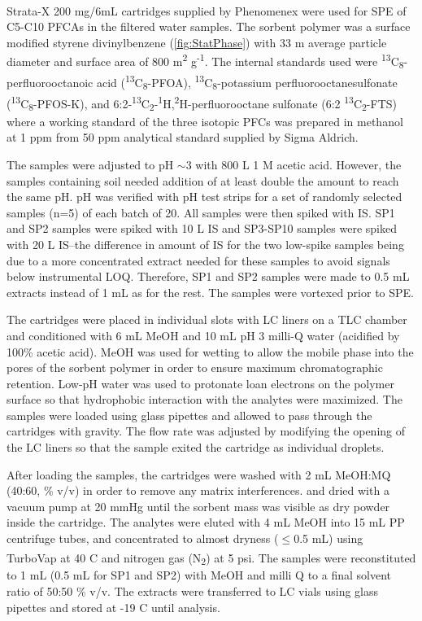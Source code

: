 Strata-X\textsuperscript{\textregistered} 200 mg/6mL cartridges supplied by Phenomenex were used for SPE of C5-C10 PFCAs in the filtered water samples. The sorbent polymer was a surface modified styrene divinylbenzene (\cref{fig:StatPhase}) with 33 \textmu m average particle diameter and surface area of 800 m\textsuperscript{2} g\textsuperscript{-1}. The internal standards used were \textsuperscript{13}C\textsubscript{8}-perfluorooctanoic acid  (\textsuperscript{13}C\textsubscript{8}-PFOA), \textsuperscript{13}C\textsubscript{8}-potassium perfluorooctanesulfonate (\textsuperscript{13}C\textsubscript{8}-PFOS-K), and 6:2-\textsuperscript{13}C\textsubscript{2}-\textsuperscript{1}H,\textsuperscript{2}H-perfluorooctane sulfonate  (6:2 \textsuperscript{13}C\textsubscript{2}-FTS) where a working standard of the three isotopic PFCs was prepared in methanol at 1 ppm from 50 ppm analytical standard supplied by Sigma Aldrich.

The samples were adjusted to pH $\sim$3 with 800 \textmu L 1 M acetic acid. However, the samples containing soil needed addition of at least double the amount to reach the same pH. pH was verified with pH test strips for a set of randomly selected samples (n=5) of each batch of 20. All samples were then spiked with IS. SP1 and SP2 samples were spiked with 10 \textmu L IS and SP3-SP10 samples were spiked with 20 \textmu L IS--the difference in amount of IS for the two low-spike samples being due to a more concentrated extract needed for these samples to avoid signals below instrumental LOQ. Therefore, SP1 and SP2 samples were made to 0.5 mL extracts instead of 1 mL as for the rest. The samples were vortexed prior to SPE.

The cartridges were placed in individual slots with LC liners on a TLC chamber and conditioned with 6 mL MeOH and 10 mL pH 3 milli-Q water (acidified by 100\% acetic acid). MeOH was used for wetting to allow the mobile phase into the pores of the sorbent polymer in order to ensure maximum chromatographic retention. Low-pH water was used to protonate loan electrons on the polymer surface so that hydrophobic interaction with the analytes were maximized. The samples were loaded using glass pipettes and allowed to pass through the cartridges with gravity. The flow rate was adjusted by modifying the opening of the LC liners so that the sample exited the cartridge as individual droplets. 

After loading the samples, the cartridges were washed with 2 mL MeOH:MQ (40:60, \% v/v) in order to remove any matrix interferences.  and dried with a vacuum pump at 20 mmHg until the sorbent mass was visible as dry powder inside the cartridge. The analytes were eluted with 4 mL MeOH into 15 mL PP centrifuge tubes, and concentrated to almost dryness ($\le$0.5 mL) using TurboVap\textsuperscript{\textregistered} at 40 \textdegree C and nitrogen gas (N\textsubscript{2}) at 5 psi. The samples were reconstituted to 1 mL (0.5 mL for SP1 and SP2) with MeOH and milli Q to a final solvent ratio of 50:50 \% v/v. The extracts were transferred to LC vials using glass pipettes and stored at -19 \textdegree C until analysis.

